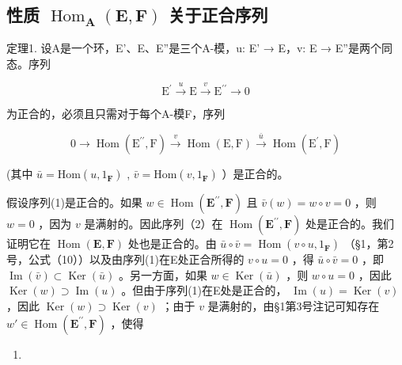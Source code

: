 \subsection{\texorpdfstring{性质 \(\operatorname{Hom}_{\mathbf{A}}(\mathbf{E}, \mathbf{F})\) 关于正合序列}{性质 \textbackslash operatorname\{Hom\}\_\{\textbackslash mathbf\{A\}\}(\textbackslash mathbf\{E\}, \textbackslash mathbf\{F\}关于正合序列的相对性}}

定理1. 设A是一个环，E'、E、E''是三个A-模，u: E' → E，v: E → E''是两个同态。序列

\[
\mathrm{E} ^ {\prime} \stackrel {u} {\longrightarrow} \mathrm{E} \stackrel {v} {\longrightarrow} \mathrm{E} ^ {\prime \prime} \longrightarrow 0\tag{1}
\]

为正合的，必须且只需对于每个A-模F，序列

\[
0 \longrightarrow \operatorname{Hom} (\mathrm{E} ^ {\prime \prime}, \mathrm{F}) \stackrel {v} {\longrightarrow} \operatorname{Hom} (\mathrm{E}, \mathrm{F}) \stackrel {\bar {u}} {\longrightarrow} \operatorname{Hom} (\mathrm{E} ^ {\prime}, \mathrm{F})\tag{2}
\]

(其中 \(\bar{u} = \mathrm{Hom}(u, 1_{\mathbf{F}})\) , \(\bar{v} = \mathrm{Hom}(v, 1_{\mathbf{F}})\) ）是正合的。

假设序列(1)是正合的。如果 \(w \in \operatorname{Hom}(\mathbf{E}^{\prime \prime}, \mathbf{F})\) 且 \(\bar{v}(w) = w \circ v = 0\) ，则 \(w = 0\) ，因为 \(v\) 是满射的。因此序列（2）在 \(\operatorname{Hom}(\mathbf{E}^{\prime \prime}, \mathbf{F})\) 处是正合的。我们证明它在 \(\operatorname{Hom}(\mathbf{E}, \mathbf{F})\) 处也是正合的。由 \(\bar{u} \circ \bar{v} = \operatorname{Hom}(v \circ u, 1_{\mathbf{F}})\) （§1，第2号，公式（10））以及由序列(1)在E处正合所得的 \(v \circ u = 0\) ，得 \(\bar{u} \circ \bar{v} = 0\) ，即 \(\operatorname{Im}(\bar{v}) \subset \operatorname{Ker}(\bar{u})\) 。另一方面，如果 \(w \in \operatorname{Ker}(\bar{u})\) ，则 \(w \circ u = 0\) ，因此 \(\operatorname{Ker}(w) \supset \operatorname{Im}(u)\) 。但由于序列(1)在E处是正合的， \(\operatorname{Im}(u) = \operatorname{Ker}(v)\) ，因此 \(\operatorname{Ker}(w) \supset \operatorname{Ker}(v)\) ；由于 \(v\) 是满射的，由§1第3号注记可知存在 \(w' \in \operatorname{Hom}(\mathbf{E}^{\prime \prime}, \mathbf{F})\) ，使得

\begin{enumerate}
\def\labelenumi{(\arabic{enumi})}
\setcounter{enumi}{3}
\tightlist
\item
\end{enumerate}

